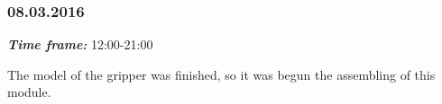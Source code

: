 \subsubsection{08.03.2016}
\textit{\textbf{Time frame:}} 12:00-21:00 

The model of the gripper was finished, so it was begun the assembling of this module.

